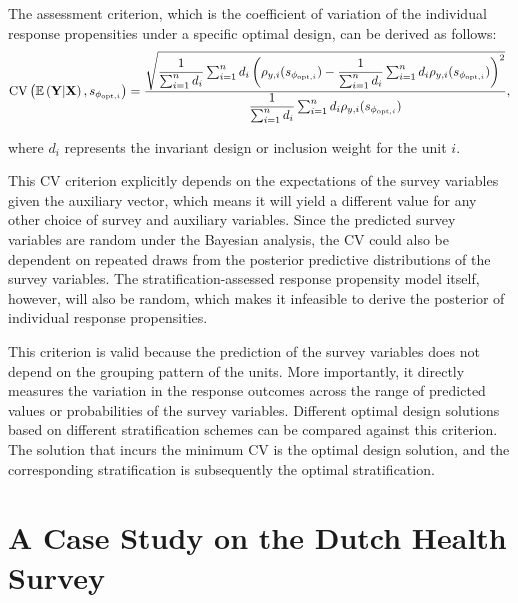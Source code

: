 \documentclass[12pt]{article}
\begin{document}
The assessment criterion, which is the coefficient of variation of the individual response propensities under a specific optimal design, can be derived as follows:
\let\saveeqnno\theequation
\let\savefrac\frac
\def\dispfrac{\displaystyle\savefrac}
\begin{eqnarray}
\let\frac\dispfrac
\gdef\theequation{17}
\let\theHequation\theequation
\label{equation-CV-criterion}
	\mathrm{CV}\left(\mathbb{E}\left(\mathbf{Y}|\mathbf{X}\right),s_{\phi_{\mathrm{opt},i}}\right)=
	\dfrac{\sqrt{\dfrac{1}{\sum^n_{i=1}d_i}\sum^n_{i=1}d_i\left(\rho_{y,i}(s_{\phi_{\mathrm{opt},i}})-\dfrac{1}{\sum^n_{i=1}d_i}\sum^n_{i=1}d_i\rho_{y,i}(s_{\phi_{\mathrm{opt},i}})\right)^2}}
	{\dfrac{1}{\sum^n_{i=1}d_i}\sum^n_{i=1}d_i\rho_{y,i}(s_{\phi_{\mathrm{opt},i}})},
\end{eqnarray}
\global\let\theequation\saveeqnno
\addtocounter{equation}{-1}\ignorespaces
where $d_i$ represents the invariant design or inclusion weight for the unit $i$.

This $\mathrm{CV}$ criterion explicitly depends on the expectations of the survey variables given the auxiliary vector, which means it will yield a different value for any other choice of survey and auxiliary variables.
Since the predicted survey variables are random under the Bayesian analysis, the $\mathrm{CV}$ could also be dependent on repeated draws from the posterior predictive distributions of the survey variables.
The stratification-assessed response propensity model itself, however, will also be random, which makes it infeasible to derive the posterior of individual response propensities.

This criterion is valid because the prediction of the survey variables does not depend on the grouping pattern of the units.
More importantly, it directly measures the variation in the response outcomes across the range of predicted values or probabilities of the survey variables.
Different optimal design solutions based on different stratification schemes can be compared against this criterion.
The solution that incurs the minimum $\mathrm{CV}$ is the optimal design solution, and the corresponding stratification is subsequently the optimal stratification. 


\section{A Case Study on the Dutch Health Survey}
\label{sec:case-study-dutch-health-survey}
\end{document}

